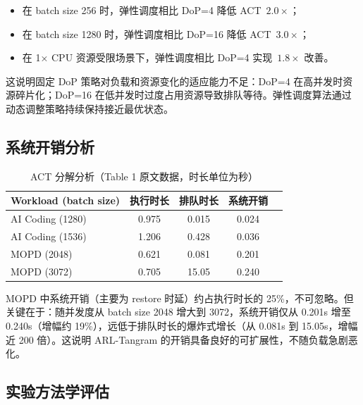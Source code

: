 \documentclass[11pt, a4paper]{article}
\begin{document}
\begin{itemize}
  \item 在 batch size 256 时，弹性调度相比 DoP=4 降低 ACT~$2.0\times$；
  \item 在 batch size 1280 时，弹性调度相比 DoP=16 降低 ACT~$3.0\times$；
  \item 在 1× CPU 资源受限场景下，弹性调度相比 DoP=4 实现~$1.8\times$ 改善。
\end{itemize}

这说明固定 DoP 策略对负载和资源变化的适应能力不足：DoP=4 在高并发时资源碎片化；DoP=16 在低并发时过度占用资源导致排队等待。弹性调度算法通过动态调整策略持续保持接近最优状态。

\subsection{系统开销分析}

\begin{table}[htbp]
\centering
\caption{ACT 分解分析（Table 1 原文数据，时长单位为秒）}
\label{tab:overhead}
\begin{tabular}{lcccc}
\toprule
\textbf{Workload (batch size)} & \textbf{执行时长} & \textbf{排队时长} & \textbf{系统开销} \\
\midrule
AI Coding (1280) & 0.975 & 0.015 & 0.024 \\
AI Coding (1536) & 1.206 & 0.428 & 0.036 \\
MOPD (2048)      & 0.621 & 0.081 & 0.201 \\
MOPD (3072)      & 0.705 & 15.05 & 0.240 \\
\bottomrule
\end{tabular}
\end{table}

\begin{keyinsight}
MOPD 中系统开销（主要为 restore 时延）约占执行时长的 25\%，不可忽略。但关键在于：随并发度从 batch size 2048 增大到 3072，系统开销仅从 0.201s 增至 0.240s（增幅约 19\%），远低于排队时长的爆炸式增长（从 0.081s 到 15.05s，增幅近 200 倍）。这说明 ARL-Tangram 的开销具备良好的可扩展性，不随负载急剧恶化。
\end{keyinsight}

\subsection{实验方法学评估}
\end{document}

